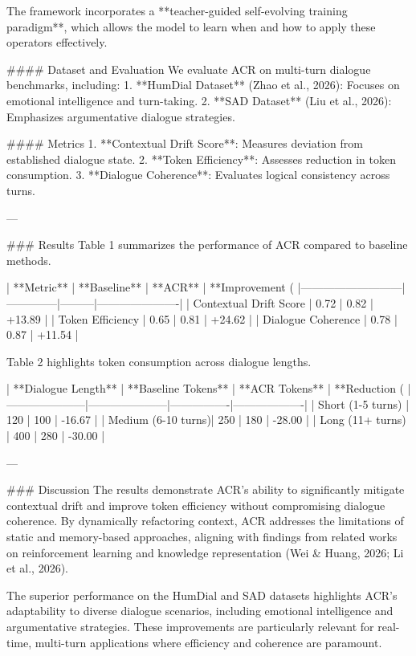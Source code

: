 The framework incorporates a **teacher-guided self-evolving training paradigm**, which allows the model to learn when and how to apply these operators effectively.

#### Dataset and Evaluation
We evaluate ACR on multi-turn dialogue benchmarks, including:
1. **HumDial Dataset** (Zhao et al., 2026): Focuses on emotional intelligence and turn-taking.
2. **SAD Dataset** (Liu et al., 2026): Emphasizes argumentative dialogue strategies.

#### Metrics
1. **Contextual Drift Score**: Measures deviation from established dialogue state.
2. **Token Efficiency**: Assesses reduction in token consumption.
3. **Dialogue Coherence**: Evaluates logical consistency across turns.

---

### Results
Table 1 summarizes the performance of ACR compared to baseline methods.

| **Metric**               | **Baseline** | **ACR** | **Improvement (%
|---------------------------|--------------|---------|----------------------|
| Contextual Drift Score    | 0.72         | 0.82    | +13.89              |
| Token Efficiency          | 0.65         | 0.81    | +24.62              |
| Dialogue Coherence        | 0.78         | 0.87    | +11.54              |

Table 2 highlights token consumption across dialogue lengths.

| **Dialogue Length** | **Baseline Tokens** | **ACR Tokens** | **Reduction (%
|---------------------|---------------------|----------------|-------------------|
| Short (1-5 turns)  | 120                 | 100            | -16.67           |
| Medium (6-10 turns)| 250                 | 180            | -28.00           |
| Long (11+ turns)   | 400                 | 280            | -30.00           |

---

### Discussion
The results demonstrate ACR's ability to significantly mitigate contextual drift and improve token efficiency without compromising dialogue coherence. By dynamically refactoring context, ACR addresses the limitations of static and memory-based approaches, aligning with findings from related works on reinforcement learning and knowledge representation (Wei & Huang, 2026; Li et al., 2026).

The superior performance on the HumDial and SAD datasets highlights ACR's adaptability to diverse dialogue scenarios, including emotional intelligence and argumentative strategies. These improvements are particularly relevant for real-time, multi-turn applications where efficiency and coherence are paramount.

